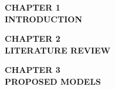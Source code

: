 \documentclass[openany, 12pt]{book}
\begin{document}
	\setcounter{page}{1}
	\vspace*{\fill} %
	\thispagestyle{chapterpages}
	\begin{center} %
		\begin{minipage}{0.8\textwidth} %
			\centering %
			{\color{RoyalBlue}\fontsize{30pt}{20pt}\bfseries\selectfont
				CHAPTER 1 
				\\[0.2cm] INTRODUCTION
			}
		\end{minipage}
	\end{center}
	\vfill %
	
	
	
	\vspace*{\fill} %
	\thispagestyle{chapterpages}
	\begin{center} %
		\begin{minipage}{0.9\textwidth} %
			\centering %
			{\color{RoyalBlue}\fontsize{30pt}{20pt}\bfseries\selectfont
				CHAPTER 2 
				\\[0.2cm] LITERATURE REVIEW
			}
		\end{minipage}
	\end{center}
	\vfill %
	\newpage
	
	
	
	\vspace*{\fill} %
	\thispagestyle{chapterpages}
	\begin{center} %
		\begin{minipage}{0.9\textwidth} %
			\centering %
			{\color{RoyalBlue}\fontsize{30pt}{20pt}\bfseries\selectfont
				CHAPTER 3 
				\\[0.2cm] PROPOSED MODELS
			}
		\end{minipage}
	\end{center}
	\vfill %
	\newpage
	
\end{document}
